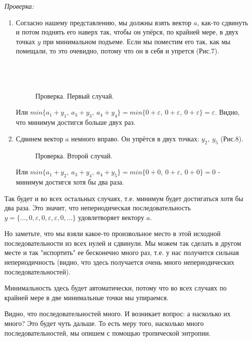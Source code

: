 \documentclass[russian]{lecture-notes}
\begin{document}
\emph{Проверка:}
\begin{enumerate}
 \item
Согласно нашему представлению, мы должны взять вектор $a$, как-то сдвинуть и потом поднять его наверх так, чтобы он упёрся, по крайней мере, в двух точках $y$ при минимальном подъеме. Если мы поместим его так, как мы помещали, то это очевидно, потому что он в себя и упрется (Рис.7).\\\\\\\\

\begin{figure}[h!]
\caption{Проверка. Первый случай.}
\end{figure}

Или $min\{a_1+y_1,\ a_3+y_3,\ a_4+y_4\}=min\{0+\varepsilon,\ 0+\varepsilon,\ 0+\varepsilon\}=\varepsilon$. Видно, что минимум достигся больше двух раз.
\item
Сдвинем вектор $a$ немного вправо. Он упрётся в двух точках: $y_2,\ y_5$  (Рис.8).
\begin{figure}[h!]
\caption{Проверка. Второй случай.}
\end{figure}

Или $min\{a_1+y_2,\ a_3+y_4,\ a_4+y_5\}=min\{0+0,\ 0+\varepsilon,\ 0+0\}=0$ - минимум достигся хотя бы два раза.
\end{enumerate}

Так будет и во всех остальных случаях, т.е. минимум будет достигаться хотя бы два раза. Это значит, что непериодическая последовательность  $y=\{\ldots,0,\varepsilon,0,\varepsilon,\varepsilon,0,\ldots\}$ удовлетворяет вектору $a$.

Но заметьте, что мы взяли какое-то произвольное место  в этой исходной последовательности из всех нулей и сдвинули. Мы можем так сделать в другом месте и так "испортить"\: ее бесконечно много раз, т.е. у нас получится сильная непериодичность (видно, что здесь получается очень много непериодических последовательностей).

Минимальность здесь будет автоматически,
потому что во всех случаях по крайней мере в две минимальные точки мы упираемся.

Видно, что последовательностей много. И возникает вопрос: а насколько их много? Это будет чуть дальше. То есть меру того,
насколько много последовательностей, мы опишем с помощью тропической энтропии.
\end{document}
